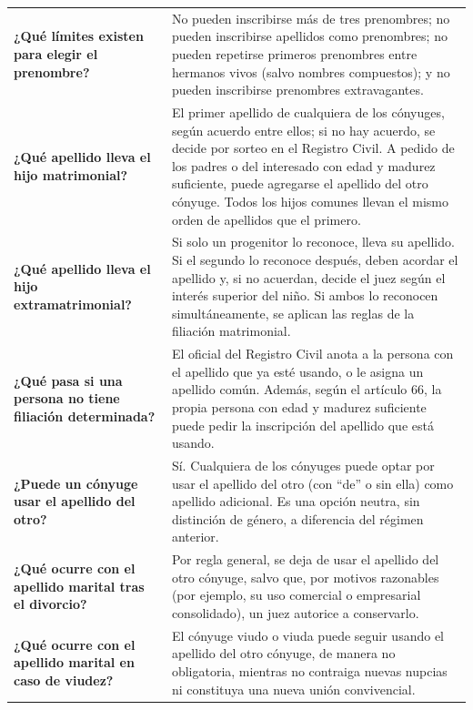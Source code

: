 \documentclass[12pt,oneside]{book}
\begin{document}
\begin{longtable}{
    >{\raggedright\arraybackslash}p{}
    >{\raggedright\arraybackslash}p{}
}
\textbf{¿Qué límites existen para elegir el prenombre?} &
No pueden inscribirse más de tres prenombres; no pueden inscribirse apellidos como prenombres; no pueden repetirse primeros prenombres entre hermanos vivos (salvo nombres compuestos); y no pueden inscribirse prenombres extravagantes. \\

\textbf{¿Qué apellido lleva el hijo matrimonial?} &
El primer apellido de cualquiera de los cónyuges, según acuerdo entre ellos; si no hay acuerdo, se decide por sorteo en el Registro Civil. A pedido de los padres o del interesado con edad y madurez suficiente, puede agregarse el apellido del otro cónyuge. Todos los hijos comunes llevan el mismo orden de apellidos que el primero. \\

\textbf{¿Qué apellido lleva el hijo extramatrimonial?} &
Si solo un progenitor lo reconoce, lleva su apellido. Si el segundo lo reconoce después, deben acordar el apellido y, si no acuerdan, decide el juez según el interés superior del niño. Si ambos lo reconocen simultáneamente, se aplican las reglas de la filiación matrimonial. \\

\textbf{¿Qué pasa si una persona no tiene filiación determinada?} &
El oficial del Registro Civil anota a la persona con el apellido que ya esté usando, o le asigna un apellido común. Además, según el artículo 66, la propia persona con edad y madurez suficiente puede pedir la inscripción del apellido que está usando. \\

\textbf{¿Puede un cónyuge usar el apellido del otro?} &
Sí. Cualquiera de los cónyuges puede optar por usar el apellido del otro (con ``de'' o sin ella) como apellido adicional. Es una opción neutra, sin distinción de género, a diferencia del régimen anterior. \\

\textbf{¿Qué ocurre con el apellido marital tras el divorcio?} &
Por regla general, se deja de usar el apellido del otro cónyuge, salvo que, por motivos razonables (por ejemplo, su uso comercial o empresarial consolidado), un juez autorice a conservarlo. \\

\textbf{¿Qué ocurre con el apellido marital en caso de viudez?} &
El cónyuge viudo o viuda puede seguir usando el apellido del otro cónyuge, de manera no obligatoria, mientras no contraiga nuevas nupcias ni constituya una nueva unión convivencial. \\


\end{longtable}
\end{document}
